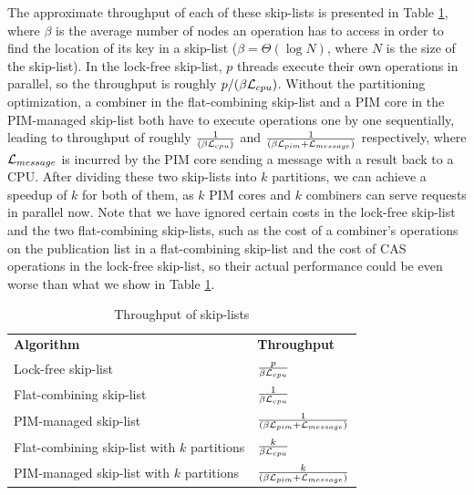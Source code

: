The approximate throughput of each of these skip-lists is presented in Table \ref{tab:skiplist}, 
where $\beta$ is the average number of nodes an operation has to access 
in order to find the location of its key in a skip-list
($\beta = \Theta(\log N)$, where $N$ is the size of the skip-list).
In the lock-free skip-list, $p$ threads execute their own operations in parallel, 
so the throughput is roughly $p/(\beta\mathcal{L}_{cpu})$. 
Without the partitioning optimization, a combiner in the flat-combining skip-list and a PIM core 
in the PIM-managed skip-list both have to execute operations one by one sequentially, 
leading to throughput of roughly ${1 \over (\beta\mathcal{L}_{cpu})}$ and ${1 \over (\beta\mathcal{L}_{pim} + \mathcal{L}_{message})}$ respectively, 
where $\mathcal{L}_{message}$ is incurred by the PIM core sending a message with a result back to a CPU. 
After dividing these two skip-lists into $k$ partitions, we can achieve a speedup of $k$ for both of them, 
as $k$ PIM cores and $k$ combiners can serve requests in parallel now. 
Note that we have ignored certain costs in the lock-free skip-list and the two flat-combining skip-lists, 
such as the cost of a combiner's operations on the publication list in a flat-combining skip-list
and the cost of CAS operations in the lock-free skip-list, 
so their actual performance could be even worse than what we show in Table \ref{tab:skiplist}.  

\begin{table}[ht!]
\begin{center}
	\begin{tabular}{| >{\small}l | l |}
    \hline
    \textbf{Algorithm} & \textbf{Throughput} \\ \hhline{|=|=|} 
    Lock-free skip-list & ${p \over \beta\mathcal{L}_{cpu}}$ \\ \hline
    Flat-combining skip-list & ${1 \over \beta\mathcal{L}_{cpu}}$ \\ \hline
    PIM-managed skip-list & ${1 \over (\beta\mathcal{L}_{pim} + \mathcal{L}_{message})}$ \\ \hline
    Flat-combining skip-list with $k$ partitions & ${k \over \beta\mathcal{L}_{cpu}}$ \\ \hline
    PIM-managed skip-list with $k$ partitions & ${k \over (\beta\mathcal{L}_{pim} + \mathcal{L}_{message})}$ \\ \hline
    \end{tabular}
\end{center}
\caption{Throughput of skip-lists}
\label{tab:skiplist}
\end{table}

